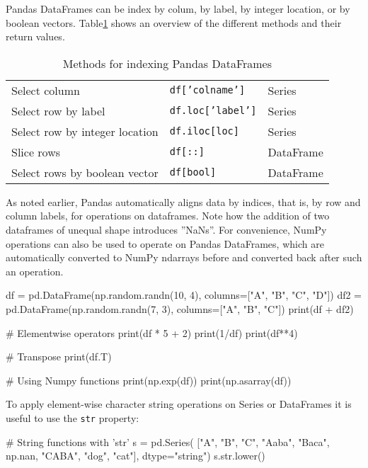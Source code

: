 Pandas DataFrames can be index by colum, by label, by integer location, or by boolean vectors. Table\ref{tab:pandasindexing} shows an overview of the different methods and their return values.

\begin{table}[h]
\centering
\renewcommand{\arraystretch}{1.25}
\begin{tabular}{l|l|l} \hline
Select column & \texttt{df['colname']} & Series \\
Select row by label & \texttt{df.loc['label']}  & Series \\
Select row by integer location & \texttt{df.iloc[loc]} & Series \\
Slice rows & \texttt{df[::]} & DataFrame \\
Select rows by boolean vector & \texttt{df[bool]} & DataFrame \\ \hline
\end{tabular}
\caption{Methods for indexing Pandas DataFrames}
\label{tab:pandasindexing}
\end{table}

As noted earlier, Pandas automatically aligns data by indices, that is, by row and column labels, for operations on dataframes. Note how the addition of two dataframes of unequal shape introduces ''NaNs''. For convenience, NumPy operations can also be used to operate on Pandas DataFrames, which are automatically converted to NumPy ndarrays before and converted back after such an operation. 

\begin{samepage}
\begin{pythoncode}
df = pd.DataFrame(np.random.randn(10, 4), 
                  columns=["A", "B", "C", "D"])
df2 = pd.DataFrame(np.random.randn(7, 3), 
                   columns=["A", "B", "C"])
print(df + df2)

# Elementwise operators
print(df * 5 + 2)
print(1/df)
print(df**4)

# Transpose
print(df.T)

# Using Numpy functions
print(np.exp(df))
print(np.asarray(df))
\end{pythoncode}
\end{samepage}

To apply element-wise character string operations on Series or DataFrames it is useful to use the \texttt{str} property:

\begin{samepage}
\begin{pythoncode}
# String functions with 'str'
s = pd.Series(
    ["A", "B", "C", "Aaba", "Baca", np.nan, 
     "CABA", "dog", "cat"], dtype="string")
s.str.lower()
\end{pythoncode}
\end{samepage}

